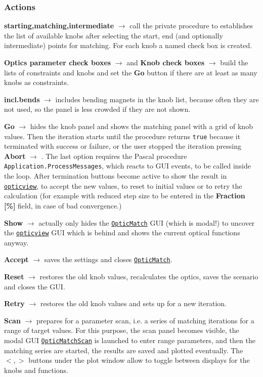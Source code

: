 \documentclass[12pt]{article}
\newcommand\code[1]{{\tt #1}}
\newcommand{\ofld}[1]{\colorbox{black!15}{{\bf #1}}}
\newcommand\guico[1]{{\color{blue}\code{#1}}}
\newcommand{\evcod}[2]{\ofld{#1} $\rightarrow$ \guico{#2}}
\newcommand{\opagui}[1]{\colorbox{blue!20}{\code{#1}}}
\newcommand{\ogui}[1]{\hyperref[#1]{\opagui{#1}}}
\newcommand{\act}[1]{\subsubsection*{Actions} #1}
\begin{document}
\act{
\evcod{starting,matching,intermediate}{(ini,mat,mid)pointChange} call the private procedure \guico{knoblist} to establishes the list of available knobs after selecting the start, end (and optionally intermediate) points for matching. For each knob a named check box is created.

\evcod{Optics parameter check boxes}{cselClick} and \evcod{Knob check boxes}{knobSelect} build the lists of constraints and knobs and set the \ofld{Go} button if there are at least as many knobs as constraints.

\evcod{incl.bends}{cbxIncBendsClick} includes bending magnets in the knob list, because often they are not used, so the panel is less crowded if they are not shown.

\evcod{Go}{gobutClick} hides the knob panel\guico{panknobs} and shows the matching panel \guico{panmat} with a grid of knob values. Then the iteration starts until the procedure \guico{Step} returns \code{true} because it terminated with success or failure, or the user stopped the iteration pressing \evcod{Abort}{bustopClick}. The last option requires the Pascal procedure \code{Application.ProcessMessages}, which reacts to GUI events, to be called inside the loop. After termination buttons become active to show the result in \ogui{opticview}, to accept the new values, to reset to initial values or to retry the calculation (for example with reduced step size to be entered in the \ofld{Fraction [\%]} field, in case of bad convergence.)

\evcod{Show}{butShowClick} actually only hides the \ogui{OpticMatch} GUI (which is modal!) to  uncover the \ogui{opticview} GUI which is behind and shows the current optical functions anyway.

\evcod{Accept}{butaccClick} saves the settings and closes \ogui{OpticMatch}.

\evcod{Reset}{butaccresClick} restores the old knob values, recalculates the optics, saves the scenario and closes the GUI.

\evcod{Retry}{butrtyClick} restores the old knob values and sets up for a new iteration.

\evcod{Scan}{ScanClick} prepares for a parameter scan, i.e. a series of matching iterations for a range of target values. For this purpose, the scan panel \guico{panfig} becomes visible, the modal GUI \ogui{OpticMatchScan} is launched to enter range parameters, and then the matching series are started, the results are saved and plotted eventually. The \ofld{$<,>$} buttons under the plot window allow to toggle between displays for the knobs and functions.
}
\end{document}
